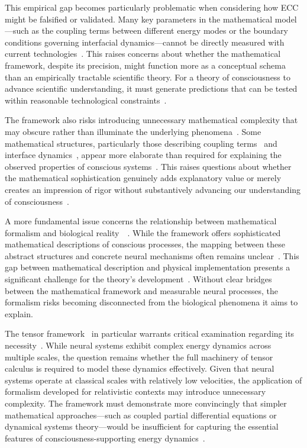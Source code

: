 This empirical gap becomes particularly problematic when considering how ECC might be falsified or validated. Many key parameters in the mathematical model—such as the coupling terms between different energy modes or the boundary conditions governing interfacial dynamics—cannot be directly measured with current technologies~\cite{pinotsis2023vivo, koch2019feeling}. This raises concerns about whether the mathematical framework, despite its precision, might function more as a conceptual schema than an empirically tractable scientific theory. For a theory of consciousness to advance scientific understanding, it must generate predictions that can be tested within reasonable technological constraints~\cite{chalmers2010character, thompson2014waking}.

The framework also risks introducing unnecessary mathematical complexity that may obscure rather than illuminate the underlying phenomena~\cite{dennett2017bacteria, pigliucci2013philosophy}. Some mathematical structures, particularly those describing coupling terms~ and interface dynamics~, appear more elaborate than required for explaining the observed properties of conscious systems~\cite{merleau2012phenomenology, pinotsis2023vivo}. This raises questions about whether the mathematical sophistication genuinely adds explanatory value or merely creates an impression of rigor without substantively advancing our understanding of consciousness~\cite{block2009comparing, goff2019galileo}.

A more fundamental issue concerns the relationship between mathematical formalism and biological reality~~\cite{churchland2013touching, gibson2015ecological}. While the framework offers sophisticated mathematical descriptions of conscious processes, the mapping between these abstract structures and concrete neural mechanisms often remains unclear~\cite{noe2009out, feinberg2016ancient}. This gap between mathematical description and physical implementation presents a significant challenge for the theory's development~. Without clear bridges between the mathematical framework and measurable neural processes, the formalism risks becoming disconnected from the biological phenomena it aims to explain.

The tensor framework~ in particular warrants critical examination regarding its necessity~\cite{thompson2010mind, zahavi2014self}. While neural systems exhibit complex energy dynamics across multiple scales, the question remains whether the full machinery of tensor calculus is required to model these dynamics effectively. Given that neural systems operate at classical scales with relatively low velocities, the application of formalism developed for relativistic contexts may introduce unnecessary complexity. The framework must demonstrate more convincingly that simpler mathematical approaches—such as coupled partial differential equations or dynamical systems theory—would be insufficient for capturing the essential features of consciousness-supporting energy dynamics~\cite{kelso2016dynamic, bosl2025dynamical}.

